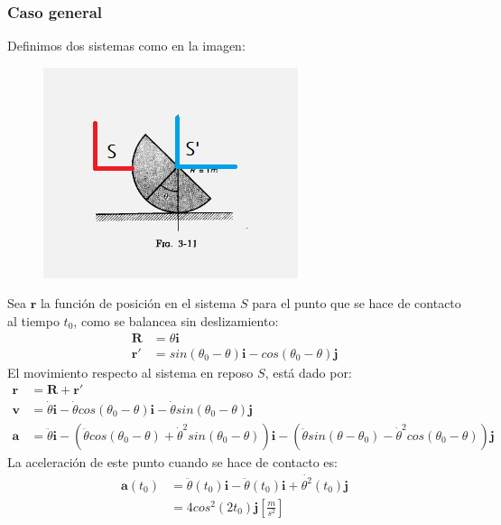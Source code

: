 \documentclass{article}
\begin{document}
\begin{tcolorbox}[breakable]
    \subsubsection*{Caso general}
    Definimos dos sistemas como en la imagen:
    \begin{figure}[H]
        \centering 
        \includegraphics[trim=20 20 20 20, clip]{p5_cylinder.png}
    \end{figure}
    Sea $\bm{r}$ la función de posición en el sistema $S$ para el punto que se hace de contacto al tiempo $t_0$,
    como se balancea sin deslizamiento:
    \begin{align*}
        \bm{R} &= \theta \bm{i} \\
        \bm{r'} &= sin(\theta_0-\theta)\bm{i} - cos(\theta_0-\theta)\bm{j}
    \end{align*}
    El movimiento respecto al sistema en reposo $S$, está dado por:
    \begin{align*}
        \bm{r} &= \bm{R} + \bm{r'} \\
        \bm{v} &=\dot{\theta}\bm{i} 
        - \dot{\theta}cos(\theta_0-\theta)\bm{i} 
        - \dot{\theta}sin(\theta_0-\theta)\bm{j} \\ 
        \bm{a} 
        &=\ddot{\theta}\bm{i} 
        -(\ddot{\theta}cos(\theta_0-\theta) + \dot{\theta}^2sin(\theta_0-\theta))\bm{i} 
        -(\ddot{\theta}sin(\theta-\theta_0) - \dot{\theta}^2cos(\theta_0-\theta))\bm{j}  
    \end{align*}
    La aceleración de este punto cuando se hace de contacto es:
    \begin{align*}
        \bm{a}(t_0) 
        &= \ddot{\theta}(t_0)\bm{i} - \ddot{\theta}(t_0)\bm{i} + \dot{\theta^2}(t_0)\bm{j} \\
        &= 4cos^2(2t_0)\bm{j} \left[ \frac{m}{s^2} \right]
    \end{align*}

\end{tcolorbox}
\end{document}
